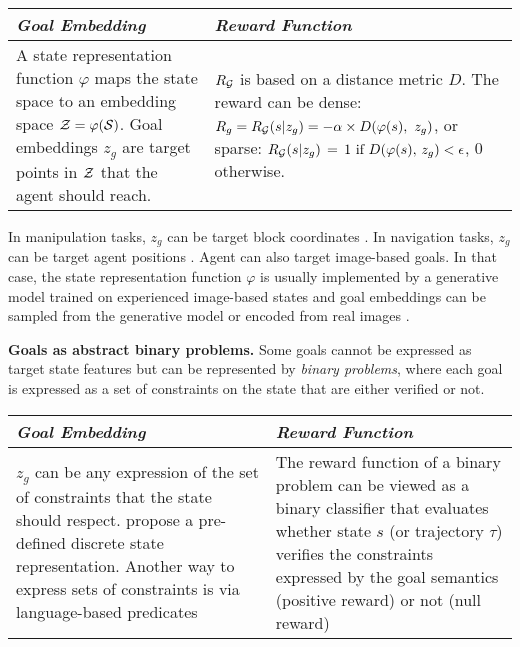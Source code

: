 \begin{table}[!h]
    \centering
    \small
    \begin{tabularx}{.85\linewidth}{X|X}
    \textit{Goal Embedding}  &    \textit{Reward Function}  \\
    \hline
     A state representation function $\varphi$ maps the state space to an embedding space $\mathcal{Z}=\varphi(\mathcal{S})$. Goal embeddings $z_g$ are target points in $\mathcal{Z}$ that the agent should reach.
        & $R_{\mathcal{G}}$ is based on a distance metric $D$. The reward can be dense: ${R_g=R_{\mathcal{G}}(s|z_g)=-\alpha\times D(\varphi(s),~z_g)}$, or sparse: ${R_{\mathcal{G}}(s|z_g)\,=\,1~\text{if}~D(\varphi(s),\,z_g)<\epsilon}$, $0$ otherwise.      
    \end{tabularx}
\end{table}
%
In manipulation tasks, $z_g$ can be target block coordinates \citep{andrychowicz2017hindsight,nair2017overcoming,plappert2018multi,curious,fournier2019clic,blaes2019control,lanier2019curiosity,ding_imitation_2019,li2019towards}. In navigation tasks, $z_g$ can be target agent positions \citep{schaul2015universal,goalgan}. Agent can also target image-based goals. In that case, the state representation function $\varphi$ is usually implemented by a generative model trained on experienced image-based states and goal embeddings can be sampled from the generative model or encoded from real images \citep{zhu2017target,codevilla2018end,nair2018visual,pong2019skew,warde2018unsupervised,florensa2019selfsupervised,venkattaramanujam2019self,pmlr-v100-lynch20a,lynch2020grounding,nair2020contextual,kovac2020grimgep}.

\noindent \textbf{Goals as abstract binary problems.} Some goals cannot be expressed as target state features but can be represented by \textit{binary problems}, where each goal is expressed as a set of constraints on the state that are either verified or not.

\begin{table}[!h]
    \centering
    \small
    \begin{tabularx}{.85\linewidth}{X|X}
    \textit{Goal Embedding}  &    \textit{Reward Function}  \\
    \hline
    $z_g$ can be any expression of the set of constraints
    that the state should respect. \citet{akakzia2020decstr,ecoffet2020first} propose a pre-defined discrete state representation. Another way to express sets of constraints is via language-based predicates
        & The reward function of a binary problem can be viewed as a binary classifier that evaluates whether state $s$ (or trajectory $\tau$) verifies the constraints expressed by the goal semantics (positive reward) or not (null reward)
    \end{tabularx}
\end{table}

